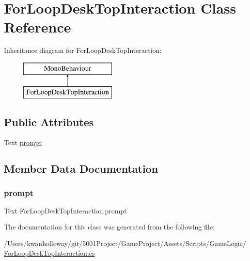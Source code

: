 \hypertarget{class_for_loop_desk_top_interaction}{}\section{For\+Loop\+Desk\+Top\+Interaction Class Reference}
\label{class_for_loop_desk_top_interaction}
Inheritance diagram for For\+Loop\+Desk\+Top\+Interaction\+:\begin{figure}[H]
\begin{center}
\leavevmode
\includegraphics[height=2.000000cm]{class_for_loop_desk_top_interaction}
\end{center}
\end{figure}
\subsection*{Public Attributes}
\begin{DoxyCompactItemize}
\item 
Text \hyperlink{class_for_loop_desk_top_interaction_a333c1f48a76d8e74cad5e01b1cad3929}{prompt}
\end{DoxyCompactItemize}


\subsection{Member Data Documentation}
\mbox{\label{class_for_loop_desk_top_interaction_a333c1f48a76d8e74cad5e01b1cad3929}} 
\subsubsection{\texorpdfstring{prompt}{prompt}}
{\footnotesize\ttfamily Text For\+Loop\+Desk\+Top\+Interaction.\+prompt}



The documentation for this class was generated from the following file\+:\begin{DoxyCompactItemize}
\item 
/\+Users/kwanholloway/git/5001\+Project/\+Game\+Project/\+Assets/\+Scripts/\+Game\+Logic/\hyperlink{_for_loop_desk_top_interaction_8cs}{For\+Loop\+Desk\+Top\+Interaction.\+cs}\end{DoxyCompactItemize}
